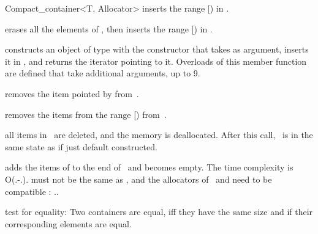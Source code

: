 \begin{ccRefClass}{Compact_container<T, Allocator>}
  {inserts the range [) in \ccVar.}

  {erases all the elements of \ccVar, then inserts the range
   [) in \ccVar.}

  {constructs an object of type  with the constructor that takes
    as argument, inserts it in \ccVar, and returns the iterator pointing
   to it.  Overloads of this member function are defined that take additional
   arguments, up to 9.}


  {removes the item pointed by  from~\ccVar.}

  {removes the items from the range [) from~\ccVar.}

  {all items in \ccVar\ are deleted, and the memory is deallocated.
   After this call, \ccVar\ is in the same state as if just default
   constructed.}



  {adds the items of  to the end of \ccVar\ and  becomes empty.
   The time complexity is O(\ccVar.-\ccVar.).
   \ccPrecond {} must not be the same as \ccVar,
   and the allocators of \ccVar\ and  need to be compatible :
   \ccVar..}


  {test for equality: Two containers are equal, iff they have the
   same size and if their corresponding elements are equal.}


\end{ccRefClass}
